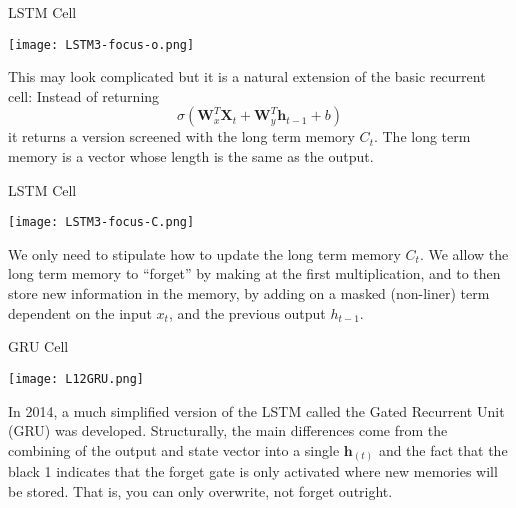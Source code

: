 \documentclass[10pt, table, dvipsnames,xcdraw, handout]{beamer}
\begin{document}
\begin{frame}[fragile]{LSTM Cell}
  \begin{minipage}[t][0.5\textheight][t]{\textwidth}
	\centering \texttt{[image: LSTM3-focus-o.png]} 
  \end{minipage}
  \vfill
\begin{minipage}[t][0.5\textheight][t]{\textwidth}
This may look  complicated but it is a natural extension of the basic recurrent cell: Instead of returning 
$$\sigma(\mathbf{W}_x^T\mathbf{X}_t +\mathbf{W}_y^T\mathbf{h}_{t-1} +b)$$
it returns a version screened with the long term memory $C_{t}$. The long term memory is a vector whose length is the same as the output. 
\end{minipage}
\end{frame}




\begin{frame}[fragile]{LSTM Cell}
  \begin{minipage}[t][0.5\textheight][t]{\textwidth}
	\centering \texttt{[image: LSTM3-focus-C.png]} 
  \end{minipage}
  \vfill
\begin{minipage}[t][0.5\textheight][t]{\textwidth}
We only need to stipulate how to update the long term memory $C_{t}$. We allow the long term memory to ``forget'' by making at the first multiplication, and to then store new information in the memory, by adding on a masked (non-liner) term dependent on the input $x_t$, and the previous output $h_{t-1}$.
\end{minipage}
\end{frame}




\begin{frame}[fragile]{GRU Cell}
  \begin{minipage}[t][0.5\textheight][t]{\textwidth}
	\centering \texttt{[image: L12GRU.png]} 
  \end{minipage}
  \vfill
\begin{minipage}[t][0.5\textheight][t]{\textwidth}
In 2014, a much simplified version of the LSTM called the Gated Recurrent Unit (GRU) was developed.  Structurally, the main differences come from the combining of the output and state vector into a single $\mathbf{h}_{(t)}$ \pause and the fact that the black 1 indicates that the forget gate is only activated where new memories will be stored. That is, you can only overwrite, not forget outright. 
\end{minipage}
\end{frame}
\end{document}
